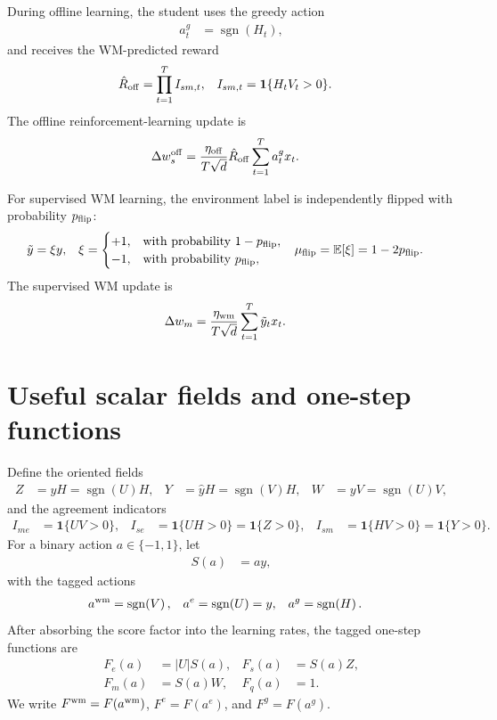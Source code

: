 \documentclass{article}
\newcommand*\sgn[1]{\operatorname{sgn}\!\left({#1}\right)}
\newcommand*\I{\mathbf 1}
\begin{document}
During offline learning, the student uses the greedy action
\begin{align}
a_t^g &= \sgn{H_t},
\end{align}
and receives the WM-predicted reward
\begin{align}
\hat R_{\rm off} &= \prod_{t=1}^T I_{sm,t}, & I_{sm,t} &= \I\{H_tV_t>0\}.
\end{align}
The offline reinforcement-learning update is
\begin{align}
\Delta w_s^{\rm off} &= \frac{\eta_{\rm off}}{T\sqrt d}\hat R_{\rm off}\sum_{t=1}^T a_t^gx_t.
\end{align}

For supervised WM learning, the environment label is independently flipped with probability $p_{\rm flip}$:
\begin{align}
\tilde y &= \xi y, & \xi &= \begin{cases}+1,&\text{with probability }1-p_{\rm flip}, \\
-1,&\text{with probability }p_{\rm flip},\end{cases} & \mu_{\rm flip} &= \mathbb E[\xi]=1-2p_{\rm flip}.
\end{align}
The supervised WM update is
\begin{align}
\Delta w_m &= \frac{\eta_{\rm wm}}{T\sqrt d}\sum_{t=1}^T \tilde y_tx_t.
\end{align}

\section{Useful scalar fields and one-step functions}

Define the oriented fields
\begin{align}
Z &= yH=\sgn{U}H, & Y &= \hat yH=\sgn{V}H, & W &= yV=\sgn{U}V,
\end{align}
and the agreement indicators
\begin{align}
I_{me} &= \I\{UV>0\}, & I_{se} &= \I\{UH>0\}=\I\{Z>0\}, & I_{sm} &= \I\{HV>0\}=\I\{Y>0\}.
\end{align}
For a binary action $a\in\{-1,1\}$, let
\begin{align}
S(a) &= ay,
\end{align}
with the tagged actions
\begin{align}
a^{\rm wm} &= \sgn{V}, & a^e &= \sgn{U}=y, & a^g &= \sgn{H}.
\end{align}
After absorbing the score factor into the learning rates, the tagged one-step functions are
\begin{align}
F_e(a) &= |U|S(a), & F_s(a) &= S(a)Z, \\
F_m(a) &= S(a)W, & F_q(a) &= 1.
\end{align}
We write $F^{\rm wm}=F(a^{\rm wm})$, $F^e=F(a^e)$, and $F^g=F(a^g)$.
\end{document}
